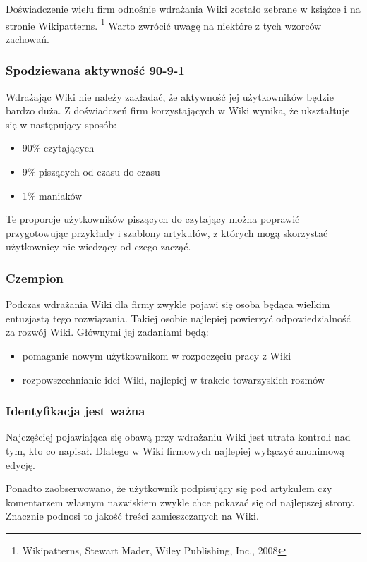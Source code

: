 \documentclass{article}
\begin{document}
Doświadczenie wielu firm odnośnie wdrażania Wiki zostało zebrane w książce i na stronie Wikipatterns. \footnote{Wikipatterns, Stewart Mader, Wiley Publishing, Inc., 2008} Warto zwrócić uwagę na niektóre z tych wzorców zachowań.


\subsubsection{Spodziewana aktywność 90-9-1}

Wdrażając Wiki nie należy zakładać, że aktywność jej użytkowników będzie bardzo duża. Z doświadczeń firm korzystających w Wiki wynika, że ukształtuje się w następujący sposób: 
		\begin{itemize}
			\item 90\% czytających
			\item 9\% piszących od czasu do czasu
			\item 1\% maniaków
		\end{itemize}
Te proporcje użytkowników piszących do czytający można poprawić przygotowując przykłady i szablony artykułów, z których mogą skorzystać użytkownicy nie wiedzący od czego zacząć.

\subsubsection{Czempion}

Podczas wdrażania Wiki dla firmy zwykle pojawi się osoba będąca wielkim entuzjastą tego rozwiązania. Takiej osobie najlepiej powierzyć odpowiedzialność za rozwój Wiki. Głównymi jej zadaniami będą:
		\begin{itemize}
			\item pomaganie nowym użytkownikom w rozpoczęciu pracy z Wiki
		\item rozpowszechnianie idei Wiki, najlepiej w trakcie towarzyskich rozmów
		\end{itemize}

\subsubsection{Identyfikacja jest ważna}

Najczęściej pojawiająca się obawą przy wdrażaniu Wiki jest utrata kontroli nad tym, kto co napisał. Dlatego w Wiki firmowych najlepiej wyłączyć anonimową edycję.

Ponadto zaobserwowano, że użytkownik podpisujący się pod artykułem czy komentarzem własnym nazwiskiem zwykle chce pokazać się od najlepszej strony. Znacznie podnosi to jakość treści zamieszczanych na Wiki.
\end{document}
